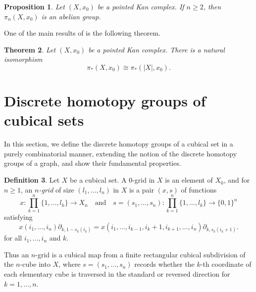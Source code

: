 \documentclass[oneside, 12pt]{amsart}
\numberwithin{equation}{section}
\theoremstyle{plain}
\newtheorem{theorem}{Theorem}[section]
\newtheorem{proposition}[theorem]{Proposition}
\theoremstyle{definition}
\newtheorem{definition}[theorem]{Definition}
\theoremstyle{remark}
\begin{document}
	
	\begin{proposition}
		Let $(X,x_0)$ be a pointed Kan complex. If $n\ge 2$, then $\pi_n(X,x_0)$ is an abelian group.
	\end{proposition}
	
	
	
	One of the main results of \cite[Theorem 3.24]{CK1} is the following theorem.
	
	
	
	
	\begin{theorem}
		\label{homotopy group realization}
		Let $(X,x_0)$ be a pointed Kan complex. There is a natural isomorphism
		\[
		\pi_*(X,x_0)\cong\pi_*(|X|,x_0).
		\]
	\end{theorem}
	
	
	
	\section{Discrete homotopy groups of cubical sets}\label{Discrete homotopy groups of cubical sets}
	
	In this section, we define the discrete homotopy groups of a cubical set in a purely combinatorial manner, extending the notion of the discrete homotopy groups of a graph, and show their fundamental properties.
	
	
	
	\begin{definition}
		Let $X$ be a cubical set. A $0$-grid in $X$ is an element of $X_0$, and for $n\ge 1$, an \emph{$n$-grid} of size $(l_1,\ldots,l_n)$ in $X$ is a pair $(x,s)$ of functions
		\[
		x\colon\prod_{k=1}^n\{1,\ldots,l_k\}\to X_n\quad\text{and}\quad s=(s_1,\ldots,s_n)\colon\prod_{k=1}^n\{1,\ldots,l_k\}\to\{0,1\}^n
		\]
		satisfying
		\[
		x(i_1,\ldots,i_n)\partial_{k,1-s_k(i_k)}=x(i_1,\ldots,i_{k-1},i_k+1,i_{k+1},\ldots,i_n)\partial_{k,s_k(i_k+1)}.
		\]
		for all $i_1,\ldots,i_n$ and $k$.
	\end{definition}
	Thus an $n$-grid is a cubical map from a finite rectangular cubical subdivision of the $n$-cube into $X$, where $s=(s_1,\ldots,s_n)$ records whether the $k$-th coordinate of each elementary cube is traversed in the standard or reversed direction for $k=1,\ldots,n$.
	
\end{document}
